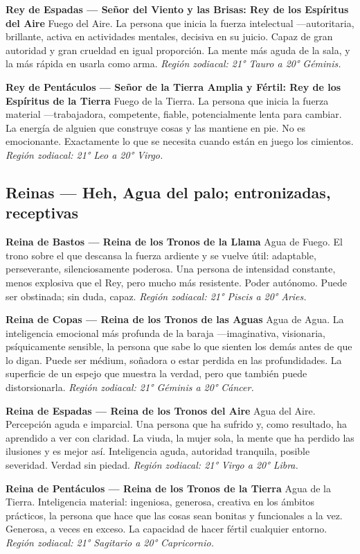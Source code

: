 \textbf{Rey de Espadas --- Señor del Viento y las Brisas: Rey de los Espíritus del Aire} Fuego del Aire. La persona que inicia la fuerza intelectual ---autoritaria, brillante, activa en actividades mentales, decisiva en su juicio. Capaz de gran autoridad y gran crueldad en igual proporción. La mente más aguda de la sala, y la más rápida en usarla como arma. \emph{Región zodiacal: 21° Tauro a 20° Géminis.}

\textbf{Rey de Pentáculos --- Señor de la Tierra Amplia y Fértil: Rey de los Espíritus de la Tierra} Fuego de la Tierra. La persona que inicia la fuerza material ---trabajadora, competente, fiable, potencialmente lenta para cambiar. La energía de alguien que construye cosas y las mantiene en pie. No es emocionante. Exactamente lo que se necesita cuando están en juego los cimientos. \emph{Región zodiacal: 21° Leo a 20° Virgo.}

\subsection{Reinas --- Heh, Agua del palo; entronizadas, receptivas}\label{queens--heh-water-of-the-suit-enthroned-receiving}

\textbf{Reina de Bastos --- Reina de los Tronos de la Llama} Agua de Fuego. El trono sobre el que descansa la fuerza ardiente y se vuelve útil: adaptable, perseverante, silenciosamente poderosa. Una persona de intensidad constante, menos explosiva que el Rey, pero mucho más resistente. Poder autónomo. Puede ser obstinada; sin duda, capaz. \emph{Región zodiacal: 21° Piscis a 20° Aries.}

\textbf{Reina de Copas --- Reina de los Tronos de las Aguas} Agua de Agua. La inteligencia emocional más profunda de la baraja ---imaginativa, visionaria, psíquicamente sensible, la persona que sabe lo que sienten los demás antes de que lo digan. Puede ser médium, soñadora o estar perdida en las profundidades. La superficie de un espejo que muestra la verdad, pero que también puede distorsionarla. \emph{Región zodiacal: 21° Géminis a 20° Cáncer.}

\textbf{Reina de Espadas --- Reina de los Tronos del Aire} Agua del Aire. Percepción aguda e imparcial. Una persona que ha sufrido y, como resultado, ha aprendido a ver con claridad. La viuda, la mujer sola, la mente que ha perdido las ilusiones y es mejor así. Inteligencia aguda, autoridad tranquila, posible severidad. Verdad sin piedad. \emph{Región zodiacal: 21° Virgo a 20° Libra.}

\textbf{Reina de Pentáculos --- Reina de los Tronos de la Tierra} Agua de la Tierra. Inteligencia material: ingeniosa, generosa, creativa en los ámbitos prácticos, la persona que hace que las cosas sean bonitas y funcionales a la vez. Generosa, a veces en exceso. La capacidad de hacer fértil cualquier entorno. \emph{Región zodiacal: 21° Sagitario a 20° Capricornio.}

